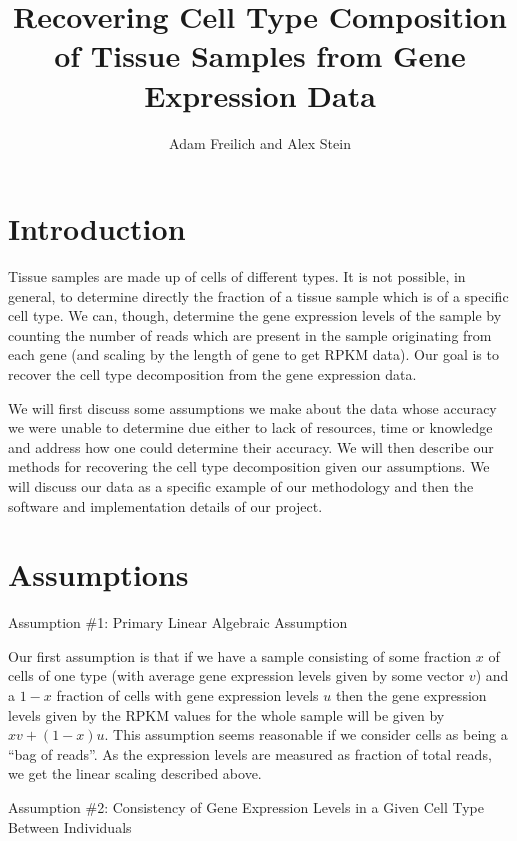 \documentclass[10pt]{article}
\author{Adam Freilich and Alex Stein}
\title{Recovering Cell Type Composition of Tissue Samples from Gene Expression Data}
\begin{document}
\maketitle

\section{Introduction}

Tissue samples are made up of cells of different types.
It is not possible, in general, to determine directly the fraction of a tissue sample which is of a specific cell type.
We can, though, determine the gene expression levels of the sample by counting the number of reads which are present in the sample originating from each gene (and scaling by the length of gene to get RPKM data).
Our goal is to recover the cell type decomposition from the gene expression data.

We will first discuss some assumptions we make about the data whose accuracy we were unable to determine due either to lack of resources, time or knowledge and address how one could determine their accuracy.
We will then describe our methods for recovering the cell type decomposition given our assumptions.
We will discuss our data as a specific example of our methodology and then the software and implementation details of our project.

\section{Assumptions}

\begin{center}
Assumption \#1: Primary Linear Algebraic Assumption
\end{center}

Our first assumption is that if we have a sample consisting of some fraction \(x\) of cells of one type (with average gene expression levels given by some vector \(v\)) and a \(1-x\) fraction of cells with gene expression levels \(u\) then the gene expression levels given by the RPKM values for the whole sample will be given by \(xv + (1-x)u\).
This assumption seems reasonable if we consider cells as being a ``bag of reads''.
As the expression levels are measured as fraction of total reads, we get the linear scaling described above.

\begin{center}
Assumption \#2: Consistency of Gene Expression Levels in a Given Cell Type Between Individuals
\end{center}
\end{document}

